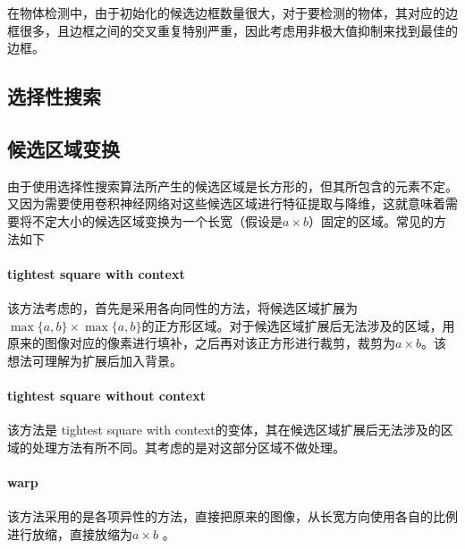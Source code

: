 在物体检测中，由于初始化的候选边框数量很大，对于要检测的物体，其对应的边框很多，且边框之间的交叉重复特别严重，因此考虑用非极大值抑制来找到最佳的边框。

\subsection{选择性搜索}

\subsection{候选区域变换}
由于使用选择性搜索算法所产生的候选区域是长方形的，但其所包含的元素不定。又因为需要使用卷积神经网络对这些候选区域进行特征提取与降维，这就意味着需要将不定大小的候选区域变换为一个长宽（假设是$a\times b$）固定的区域。常见的方法如下
\paragraph{tightest square with context}该方法考虑的，首先是采用各向同性的方法，将候选区域扩展为$\max\{a,b\}\times\max\{a,b\}$的正方形区域。对于候选区域扩展后无法涉及的区域，用原来的图像对应的像素进行填补，之后再对该正方形进行裁剪，裁剪为$a\times b$。该想法可理解为扩展后加入背景。
\paragraph{tightest square without context}该方法是 tightest square with context的变体，其在候选区域扩展后无法涉及的区域的处理方法有所不同。其考虑的是对这部分区域不做处理。
\paragraph{warp}该方法采用的是各项异性的方法，直接把原来的图像，从长宽方向使用各自的比例进行放缩，直接放缩为$a\times b$ 。
